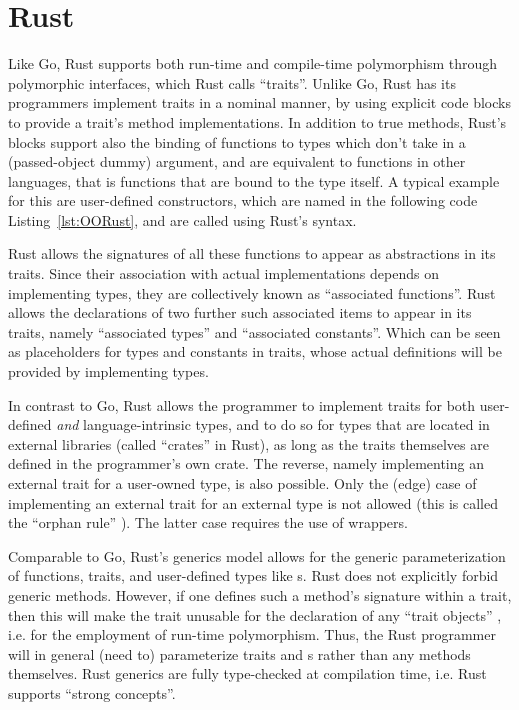\documentclass[11pt,oneside]{report}
\newcommand{\code}[1]{{\selectfont\ttfamily{#1}}}
\begin{document}
\section{Rust}
\label{sect:Rust}

Like Go, Rust supports both run-time and compile-time polymorphism
through polymorphic interfaces, which Rust calls ``traits''. Unlike
Go, Rust has its programmers implement traits in a nominal manner, by
using explicit \code{impl} code blocks to provide a trait's method
implementations. In addition to true methods, Rust's \code{impl}
blocks support also the binding of functions to types which don't take
in a \code{self} (passed-object dummy) argument, and are equivalent to
\code{static} functions in other languages, that is functions that are
bound to the type itself. A typical example for this are user-defined
constructors, which are named \code{new} in the following code
Listing~\ref{lst:OORust}, and are called using Rust's \code{::} syntax.

Rust allows the signatures of all these functions to appear as
abstractions in its traits. Since their association with actual
implementations depends on implementing types, they are collectively
known as ``associated functions''. Rust allows the declarations of two
further such associated items to appear in its traits, namely
``associated types'' and ``associated constants''. Which can be seen
as placeholders for types and constants in traits, whose actual
definitions will be provided by implementing types.

In contrast to Go, Rust allows the programmer to implement traits for
both user-defined \emph{and} language-intrinsic types, and to do so
for types that are located in external libraries (called ``crates'' in
Rust), as long as the traits themselves are defined in the
programmer's own crate. The reverse, namely implementing an external
trait for a user-owned type, is also possible. Only the (edge) case of
implementing an external trait for an external type is not allowed
(this is called the ``orphan rule'' \cite{Klabnik_Nichols}). The
latter case requires the use of wrappers.

Comparable to Go, Rust's generics model allows for the generic
parameterization of functions, traits, and user-defined types like
\code{struct}s. Rust does not explicitly forbid generic
methods. However, if one defines such a method's signature within a
trait, then this will make the trait unusable for the declaration of
any ``trait objects'' \cite{Lyon}, i.e. for the employment of run-time
polymorphism. Thus, the Rust programmer will in general (need to)
parameterize traits and \code{struct}s rather than any methods
themselves. Rust generics are fully type-checked at compilation time,
i.e. Rust supports ``strong concepts''.
\end{document}
